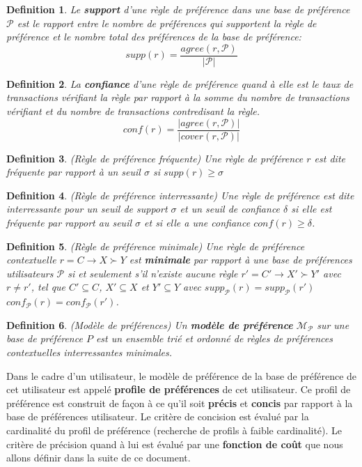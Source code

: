 \documentclass[a4paper,12pt,openany,oneside]{article}
\newtheorem{defn}{Definition} %
\begin{document}
    	\begin{defn}
    		Le \textbf{support} d'une règle de préférence dans une base de préférence $\mathcal{P}$ est le rapport entre le nombre de préférences qui supportent la règle de préférence et le nombre total des préférences de la base de préférence:
    		\[
    			supp(r)=\frac{agree(r,\mathcal{P})}{|\mathcal{P}|}
		\]
    		
    		
    	\end{defn}
    	\begin{defn}
    		La \textbf{confiance} d'une règle de préférence quand à elle est le taux de transactions vérifiant la règle par rapport à la somme du nombre de transactions vérifiant et du nombre de transactions contredisant la règle.
    		\[
    			conf(r)=\frac{|agree(r,\mathcal{P})|}{|cover(r,\mathcal{P})|}
    		\]
    	\end{defn}


    	\begin{defn}(Règle de préférence fréquente)
    		Une règle de préférence $r$ est dite fréquente par rapport à un seuil $\sigma$ si $supp(r)\geq \sigma$
	\end{defn}
    	\begin{defn}(Règle de préférence interressante)
		Une règle de préférence est dite interressante pour un seuil de support $\sigma$ et un seuil de confiance $\delta$ si elle est fréquente par rapport au seuil $\sigma$ et si elle a une confiance $conf(r)\geq\delta$.
	\end{defn}


    		

\begin{defn}(Règle de préférence minimale)
Une règle de préférence contextuelle $r=C\rightarrow X\succ Y$ est \textbf{minimale} par rapport à une base de préférences utilisateurs $\mathcal{P}$ si et seulement s'il n'existe aucune règle $r'=C'\rightarrow X'\succ Y'$ avec $r\neq r'$, tel que $C'\subseteq C$, $X'\subseteq X$ et $Y'\subseteq Y$ avec $supp_\mathcal{P}(r)=supp_\mathcal{P}(r')$ $conf_\mathcal{P}(r)=conf_\mathcal{P}(r')$.
\end{defn}

\begin{defn}(Modèle de préférences)
Un \textbf{modèle de préférence} $\mathcal{M}_\mathcal{P}$ sur une base de préférence $P$ est un ensemble trié et ordonné de règles de préférences contextuelles interressantes minimales.
\end{defn}
Dans le cadre d'un utilisateur, le modèle de préférence de la base de préférence de cet utilisateur est appelé \textbf{profile de préférences} de cet utilisateur.
Ce profil de préférence est construit de façon à ce qu'il soit \textbf{précis} et \textbf{concis} par rapport à la base de préférences utilisateur. Le critère de concision est évalué par la cardinalité du profil de préférence (recherche de profils à faible cardinalité). Le critère de précision quand à lui est évalué par une \textbf{fonction de coût} que nous allons définir dans la suite de ce document.\\
\end{document}
